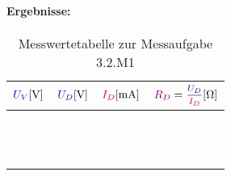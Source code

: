 \documentclass[11pt,a4paper,titlepage,parskip=half]{scrreprt}
\begin{document}
              \paragraph{Ergebnisse:}
                \begin{center}
                    \begin{table}[!hbtp]
                        \caption{Messwertetabelle zur Messaufgabe 3.2.M1}
                        \label{tbl:messergebnisse3.2}
                        \renewcommand{\arraystretch}{1.3}
                        \begin{center}

                        \begin{tabular}{c|c|c|c}
                            $\textcolor{blue}{U_V} [\si{\volt}]$ &
                            $\textcolor{blue}{U_D}[\si{\volt}]$ &
                            $\textcolor{red}{I_D} [\si{\milli\ampere}]$ &
                            $\widerstand{R_D} = \mfrac{\spannung{U_D}}{\strom{I_D}} [\si{\ohm}]$ \\ \hline

                           \quad\quad\quad & \quad\quad\quad & \quad\quad\quad & \quad\quad\quad\\\hline
                            \quad\quad\quad  & \quad\quad\quad  & \quad\quad\quad &  \quad\quad\quad \\\hline
                            &   &   &  \\\hline
                             & \quad\quad\quad  &\quad\quad\quad  & \quad\quad\quad \\\hline
                             &  & \quad\quad\quad  & \quad\quad\quad \\\hline
                             &  & \quad\quad\quad  & \quad\quad\quad \\\hline
                            &  & \quad\quad\quad  & \quad\quad\quad \\\hline
                            &  & \quad\quad\quad  & \quad\quad\quad \\\hline
                             &  & \quad\quad\quad  & \quad\quad\quad \\\hline
                             &  & \quad\quad\quad  & \quad\quad\quad \\\hline
                            &  & \quad\quad\quad  & \quad\quad\quad \\\hline
                            &  & \quad\quad\quad  & \quad\quad\quad \\
                        \end{tabular}
                    \end{center}
                    \end{table}
                \end{center}
\end{document}
